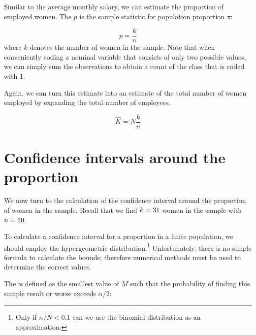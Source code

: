 Similar to the average monthly salary, we can estimate the proportion of employed women. The  $p$ is the sample statistic for population proportion $\pi$:

\begin{equation}
  p = \frac{k}{n}
  \label{eq:sample_proportion}
\end{equation}
where $k$ denotes the number of women in the sample. Note that when conveniently coding a nominal variable that consists of only two possible values, we can simply sum the observations to obtain a count of the class that is coded with 1.



Again, we can turn this estimate into an estimate of the total number of women employed by expanding the total number of employees.

\begin{equation}
  \hat{K} = N \frac{k}{n}
  \label{eq:point_estimate_number}
\end{equation}





\section{Confidence intervals around the proportion} %
\label{sec:confidence_intervals_around_the_proportion}

We now turn to the calculation of the confidence interval around the proportion of women in the sample. Recall that we find $k = \EstPropK$ women in the sample with $n = \EstPropSampleSize$. 

To calculate a confidence interval for a proportion in a finite population, we should employ the hypergeometric distribution.\footnote{Only if $n / N < 0.1$ can we use the binomial distribution as an approximation.} Unfortunately, there is no simple formula to calculate the bounds; therefore numerical methods must be used to determine the correct values.

The  is defined as the smallest value of $M$ such that the probability of finding this sample result or worse exceeds $\alpha/2$:

